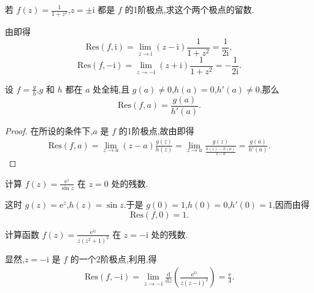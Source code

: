 \documentclass[../../main.tex]{subfiles}%
\begin{document}
\begin{example}
若 \( f(z) = \frac{1}{1 + z^2} \),\( z = \pm \mathrm{i} \) 都是 \( f \) 的1阶极点,求这个两个极点的留数.
\end{example}
\begin{solution}

由即得
\[
\mathrm{Res}(f,\mathrm{i}) = \lim_{z \to \mathrm{i}} (z - \mathrm{i}) \frac{1}{1 + z^2} = \frac{1}{2\mathrm{i}},
\]
\[
\mathrm{Res}(f, -\mathrm{i}) = \lim_{z \to -\mathrm{i}} (z + \mathrm{i}) \frac{1}{1 + z^2} = -\frac{1}{2\mathrm{i}}.
\]

\end{solution}

\begin{proposition}\label{proposition:命题5.4.5}
设 \( f = \frac{g}{h} \),\( g \) 和 \( h \) 都在 \( a \) 处全纯,且 \( g(a) \neq 0 \),\( h(a) = 0 \),\( h'(a) \neq 0 \),那么
\[
\mathrm{Res}(f,a) = \frac{g(a)}{h'(a)}.
\]
\end{proposition}
\begin{proof}

在所设的条件下,\( a \) 是 \( f \) 的1阶极点,故由即得
\begin{align*}
\mathrm{Res}(f,a) = \lim_{z \to a} (z - a) \frac{g(z)}{h(z)} = \lim_{z \to a} \frac{g(z)}{\frac{h(z) - h(a)}{z - a}} = \frac{g(a)}{h'(a)}.
\end{align*}

\end{proof}

\begin{example}
计算 \( f(z) = \frac{\mathrm{e}^z}{\sin z} \) 在 \( z = 0 \) 处的残数.
\end{example}
\begin{solution}

这时 \( g(z) = \mathrm{e}^z \),\( h(z) = \sin z \).于是 \( g(0) = 1 \),\( h(0) = 0 \),\( h'(0) = 1 \),因而由得
\[
\mathrm{Res}(f,0) = 1.
\]

\end{solution}

\begin{example}
计算函数 \( f(z) = \frac{\mathrm{e}^{\mathrm{i}z}}{z(z^2 + 1)^2} \) 在 \( z = -\mathrm{i} \) 处的残数.
\end{example}
\begin{solution}

显然,\( z = -\mathrm{i} \) 是 \( f \) 的一个2阶极点,利用,得
\begin{align*}
\mathrm{Res}(f, -\mathrm{i}) = \lim_{z \to -\mathrm{i}} \frac{\mathrm{d}}{\mathrm{d}z} \left( \frac{\mathrm{e}^{\mathrm{i}z}}{z(z - \mathrm{i})^2} \right) = \frac{\mathrm{e}}{4}.
\end{align*}

\end{solution}
\end{document}

